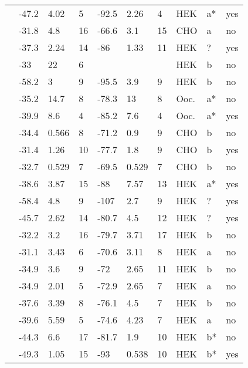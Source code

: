 \begin{longtable}{p{5cm}|lll|lll|lll}
\citet{Baroudi2001MutationDB} & -47.2 & 4.02 & 5 & -92.5 & 2.26 & 4 & HEK & a* & yes \\
\citet{Bebarova2008MutationDB} & -31.8 & 4.8 & 16 & -66.6 & 3.1 & 15 & CHO & a & no \\
\citet{Beckermann2014MutationDB} & -37.3 & 2.24 & 14 & -86 & 1.33 & 11 & HEK & ? & yes \\
\citet{Beyder2010MutationDB} & -33 & 22 & 6 & && & HEK & b & no \\
\citet{Beyder2014MutationDB} & -58.2 & 3 & 9 & -95.5 & 3.9 & 9 & HEK & b & no \\
\citet{Bezzina2003MutationDB} & -35.2 & 14.7 & 8 & -78.3 & 13 & 8 & Ooc. & a* & no \\
\citet{Bezzina2003MutationDB} & -39.9 & 8.6 & 4 & -85.2 & 7.6 & 4 & Ooc. & a* & yes \\
\citet{Calloe2011MutationDB} & -34.4 & 0.566 & 8 & -71.2 & 0.9 & 9 & CHO & b & no \\
\citet{Calloe2011MutationDB} & -31.4 & 1.26 & 10 & -77.7 & 1.8 & 9 & CHO & b & yes \\
\citet{Calloe2013MutationDB} & -32.7 & 0.529 & 7 & -69.5 & 0.529 & 7 & CHO & b & no \\
\citet{Casini2007MutationDB} & -38.6 & 3.87 & 15 & -88 & 7.57 & 13 & HEK & a* & yes \\
\citet{Chang2004MutationDB} & -58.4 & 4.8 & 9 & -107 & 2.7 & 9 & HEK & ? & yes \\
\citet{Chen2016MutationDB} & -45.7 & 2.62 & 14 & -80.7 & 4.5 & 12 & HEK & ? & yes \\
\citet{Cheng2010MutationDB} & -32.2 & 3.2 & 16 & -79.7 & 3.71 & 17 & HEK & b & no \\
\citet{Cheng2010MutationDB} & -31.1 & 3.43 & 6 & -70.6 & 3.11 & 8 & HEK & a & no \\
\citet{Cheng2010MutationDB} & -34.9 & 3.6 & 9 & -72 & 2.65 & 11 & HEK & b & no \\
\citet{Cheng2010MutationDB} & -34.9 & 2.01 & 5 & -72.9 & 2.65 & 7 & HEK & a & no \\
\citet{Cheng2011MutationDB} & -37.6 & 3.39 & 8 & -76.1 & 4.5 & 7 & HEK & b & no \\
\citet{Cheng2011MutationDB} & -39.6 & 5.59 & 5 & -74.6 & 4.23 & 7 & HEK & a & no \\
\citet{Clatot2012MutationDB} & -44.3 & 6.6 & 17 & -81.7 & 1.9 & 10 & HEK & b* & no \\
\citet{Cordeiro2006MutationDB} & -49.3 & 1.05 & 15 & -93 & 0.538 & 10 & HEK & b* & yes \\

\end{longtable}
